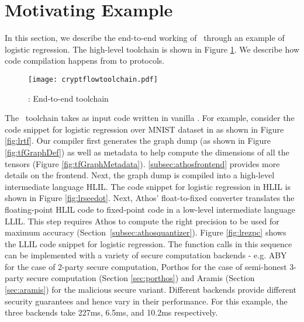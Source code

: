 \section{Motivating Example}\label{sec:toolchain}

In this section, we describe the end-to-end working of \cryptflow\ through an example of logistic regression. The high-level toolchain is shown in Figure \ref{fig:cryptflowtoolchain}. We describe how code compilation happens from \tensorflow to \mpc protocols. 

\begin{figure}
  \texttt{[image: cryptflowtoolchain.pdf]}
  \caption{\cryptflow: End-to-end toolchain}
  \label{fig:cryptflowtoolchain}
\end{figure}


The \cryptflow\ toolchain takes as input code written in vanilla
\tensorflow. For example, consider the code snippet for
logistic regression over MNIST
dataset in \tensorflow as shown in Figure \ref{fig:lrtf}. 
Our compiler
 first generates the
\tensorflow graph dump (as shown in Figure \ref{fig:tfGraphDef}) as
well as metadata to help compute the dimensions of all the tensors
(Figure \ref{fig:tfGraphMetadata}). \ref{subsec:athosfrontend}
provides more details on the frontend. Next, the \tensorflow graph
dump is compiled into a high-level intermediate language HLIL. The
code snippet for logistic regression in HLIL is shown in Figure
\ref{fig:lrseedot}. Next, Athos' float-to-fixed converter translates
the floating-point HLIL code to fixed-point code in a low-level
intermediate language LLIL. This step requires Athos to
compute the right precision to be used for maximum accuracy
(Section~\ref{subsec:athosquantizer}).
Figure \ref{fig:lrezpc} shows the
LLIL code snippet for logistic regression. The function calls in this
sequence can be implemented with a variety of secure computation
backends - e.g. ABY~\cite{aby} for the case of 2-party secure
computation, Porthos for the case of semi-honest 3-party secure
computation (Section \ref{sec:porthos}) and Aramis (Section
\ref{sec:aramis}) for the malicious secure variant. Different backends
provide different security guarantees and hence vary in their
performance. For this example, the three backends take
227ms, 6.5ms, and 10.2ms respectively.

